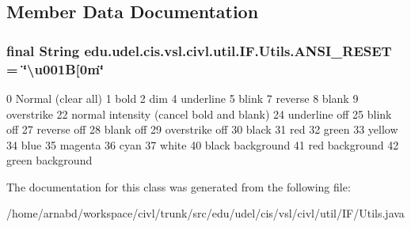 \subsection{Member Data Documentation}
\hypertarget{classedu_1_1udel_1_1cis_1_1vsl_1_1civl_1_1util_1_1IF_1_1Utils_aab62821482ee84866b7c8f6ee8add29f}{}
\subsubsection[{A\+N\+S\+I\+\_\+\+R\+E\+S\+E\+T}]{\setlength{\rightskip}{0pt plus 5cm}final String edu.\+udel.\+cis.\+vsl.\+civl.\+util.\+I\+F.\+Utils.\+A\+N\+S\+I\+\_\+\+R\+E\+S\+E\+T = \char`\"{}\textbackslash{}u001\+B\mbox{[}0m\char`\"{}\hspace{0.3cm}{\ttfamily [static]}}\label{classedu_1_1udel_1_1cis_1_1vsl_1_1civl_1_1util_1_1IF_1_1Utils_aab62821482ee84866b7c8f6ee8add29f}

\begin{DoxyPre}
0 Normal (clear all)
1 bold
2 dim
4 underline
5 blink
7 reverse
8 blank
9 overstrike
22 normal intensity (cancel bold and blank)
24 underline off
25 blink off
27 reverse off
28 blank off
29 overstrike off
30 black
31 red
32 green
33 yellow
34 blue
35 magenta
36 cyan
37 white
40 black background
41 red background
42 green background
\end{DoxyPre}
 

The documentation for this class was generated from the following file\+:\begin{DoxyCompactItemize}
\item 
/home/arnabd/workspace/civl/trunk/src/edu/udel/cis/vsl/civl/util/\+I\+F/Utils.\+java\end{DoxyCompactItemize}
